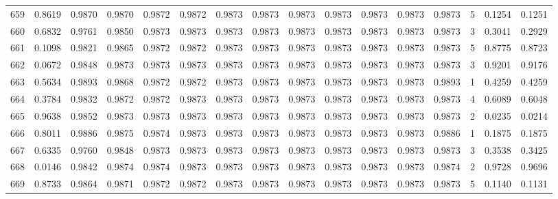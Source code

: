 \begin{tabular}{lrrrrrrrrrrrrrrr}
659 &      0.8619 &  0.9870 &  0.9870 &  0.9872 &  0.9872 &  0.9873 &  0.9873 &  0.9873 &  0.9873 &  0.9873 &   0.9873 &     0.9873 &      5 &                    0.1254 &                     0.1251 \\
660 &      0.6832 &  0.9761 &  0.9850 &  0.9873 &  0.9873 &  0.9873 &  0.9873 &  0.9873 &  0.9873 &  0.9873 &   0.9873 &     0.9873 &      3 &                    0.3041 &                     0.2929 \\
661 &      0.1098 &  0.9821 &  0.9865 &  0.9872 &  0.9872 &  0.9873 &  0.9873 &  0.9873 &  0.9873 &  0.9873 &   0.9873 &     0.9873 &      5 &                    0.8775 &                     0.8723 \\
662 &      0.0672 &  0.9848 &  0.9873 &  0.9873 &  0.9873 &  0.9873 &  0.9873 &  0.9873 &  0.9873 &  0.9873 &   0.9873 &     0.9873 &      3 &                    0.9201 &                     0.9176 \\
663 &      0.5634 &  0.9893 &  0.9868 &  0.9872 &  0.9872 &  0.9873 &  0.9873 &  0.9873 &  0.9873 &  0.9873 &   0.9873 &     0.9893 &      1 &                    0.4259 &                     0.4259 \\
664 &      0.3784 &  0.9832 &  0.9872 &  0.9872 &  0.9873 &  0.9873 &  0.9873 &  0.9873 &  0.9873 &  0.9873 &   0.9873 &     0.9873 &      4 &                    0.6089 &                     0.6048 \\
665 &      0.9638 &  0.9852 &  0.9873 &  0.9873 &  0.9873 &  0.9873 &  0.9873 &  0.9873 &  0.9873 &  0.9873 &   0.9873 &     0.9873 &      2 &                    0.0235 &                     0.0214 \\
666 &      0.8011 &  0.9886 &  0.9875 &  0.9874 &  0.9873 &  0.9873 &  0.9873 &  0.9873 &  0.9873 &  0.9873 &   0.9873 &     0.9886 &      1 &                    0.1875 &                     0.1875 \\
667 &      0.6335 &  0.9760 &  0.9848 &  0.9873 &  0.9873 &  0.9873 &  0.9873 &  0.9873 &  0.9873 &  0.9873 &   0.9873 &     0.9873 &      3 &                    0.3538 &                     0.3425 \\
668 &      0.0146 &  0.9842 &  0.9874 &  0.9874 &  0.9873 &  0.9873 &  0.9873 &  0.9873 &  0.9873 &  0.9873 &   0.9873 &     0.9874 &      2 &                    0.9728 &                     0.9696 \\
669 &      0.8733 &  0.9864 &  0.9871 &  0.9872 &  0.9872 &  0.9873 &  0.9873 &  0.9873 &  0.9873 &  0.9873 &   0.9873 &     0.9873 &      5 &                    0.1140 &                     0.1131 \\

\end{tabular}
